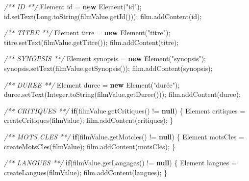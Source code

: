 \documentclass[]{article}
\newenvironment{Shaded}{}{}
\newcommand{\KeywordTok}[1]{\textcolor[rgb]{0.00,0.44,0.13}{\textbf{{#1}}}}
\newcommand{\StringTok}[1]{\textcolor[rgb]{0.25,0.44,0.63}{{#1}}}
\newcommand{\CommentTok}[1]{\textcolor[rgb]{0.38,0.63,0.69}{\textit{{#1}}}}
\newcommand{\FunctionTok}[1]{\textcolor[rgb]{0.02,0.16,0.49}{{#1}}}
\newcommand{\BuiltInTok}[1]{{#1}}
\newcommand{\NormalTok}[1]{{#1}}
\begin{document}
\begin{Shaded}
\begin{Highlighting}[]
		\CommentTok{/** ID **/}
		\BuiltInTok{Element} \NormalTok{id = }\KeywordTok{new} \BuiltInTok{Element}\NormalTok{(}\StringTok{"id"}\NormalTok{);}
		\NormalTok{id.}\FunctionTok{setText}\NormalTok{(}\BuiltInTok{Long}\NormalTok{.}\FunctionTok{toString}\NormalTok{(filmValue.}\FunctionTok{getId}\NormalTok{()));}
		\NormalTok{film.}\FunctionTok{addContent}\NormalTok{(id);}

		\CommentTok{/** TITRE **/}
		\BuiltInTok{Element} \NormalTok{titre = }\KeywordTok{new} \BuiltInTok{Element}\NormalTok{(}\StringTok{"titre"}\NormalTok{);}
		\NormalTok{titre.}\FunctionTok{setText}\NormalTok{(filmValue.}\FunctionTok{getTitre}\NormalTok{());}
		\NormalTok{film.}\FunctionTok{addContent}\NormalTok{(titre);}

		\CommentTok{/** SYNOPSIS **/}
		\BuiltInTok{Element} \NormalTok{synopsis = }\KeywordTok{new} \BuiltInTok{Element}\NormalTok{(}\StringTok{"synopsis"}\NormalTok{);}
		\NormalTok{synopsis.}\FunctionTok{setText}\NormalTok{(filmValue.}\FunctionTok{getSynopsis}\NormalTok{());}
		\NormalTok{film.}\FunctionTok{addContent}\NormalTok{(synopsis);}

		\CommentTok{/** DUREE **/}
		\BuiltInTok{Element} \NormalTok{duree = }\KeywordTok{new} \BuiltInTok{Element}\NormalTok{(}\StringTok{"durée"}\NormalTok{);}
		\NormalTok{duree.}\FunctionTok{setText}\NormalTok{(}\BuiltInTok{Integer}\NormalTok{.}\FunctionTok{toString}\NormalTok{(filmValue.}\FunctionTok{getDuree}\NormalTok{()));}
		\NormalTok{film.}\FunctionTok{addContent}\NormalTok{(duree);}

		\CommentTok{/** CRITIQUES **/}
		\KeywordTok{if}\NormalTok{(filmValue.}\FunctionTok{getCritiques}\NormalTok{() != }\KeywordTok{null}\NormalTok{) \{}
			\BuiltInTok{Element} \NormalTok{critiques = }\FunctionTok{createCritiques}\NormalTok{(filmValue);}
			\NormalTok{film.}\FunctionTok{addContent}\NormalTok{(critiques);}
		\NormalTok{\}}

		\CommentTok{/** MOTS CLES **/}
		\KeywordTok{if}\NormalTok{(filmValue.}\FunctionTok{getMotcles}\NormalTok{() != }\KeywordTok{null}\NormalTok{) \{}
			\BuiltInTok{Element} \NormalTok{motsCles = }\FunctionTok{createMotsCles}\NormalTok{(filmValue);}
			\NormalTok{film.}\FunctionTok{addContent}\NormalTok{(motsCles);}
		\NormalTok{\}}

		\CommentTok{/** LANGUES **/}
		\KeywordTok{if}\NormalTok{(filmValue.}\FunctionTok{getLangages}\NormalTok{() != }\KeywordTok{null}\NormalTok{) \{}
			\BuiltInTok{Element} \NormalTok{langues = }\FunctionTok{createLangues}\NormalTok{(filmValue);}
			\NormalTok{film.}\FunctionTok{addContent}\NormalTok{(langues);}
		\NormalTok{\}}


\end{Highlighting}
\end{Shaded}
\end{document}
